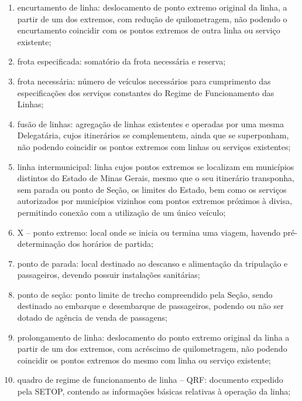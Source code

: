 \begin{enumerate}[resume,label=Art. \arabic*]
\begin{enumerate}[label=\roman*.]
\item encurtamento de linha: deslocamento de ponto extremo original da linha, a partir de um dos extremos, com redução de quilometragem, não podendo o encurtamento coincidir com os pontos extremos de outra linha ou serviço existente;

\item frota especificada: somatório da frota necessária e reserva;

\item frota necessária: número de veículos necessários para cumprimento das especificações dos serviços constantes do Regime de Funcionamento das Linhas;

\item fusão de linhas: agregação de linhas existentes e operadas por uma mesma Delegatária, cujos itinerários se complementem, ainda que se superponham, não podendo coincidir os pontos extremos com linhas ou serviços existentes;

\item linha intermunicipal: linha cujos pontos extremos se localizam em municípios distintos do Estado de Minas Gerais, mesmo que o seu itinerário transponha, sem parada ou ponto de Seção, os limites do Estado, bem como os serviços autorizados por municípios vizinhos com pontos extremos próximos à divisa, permitindo conexão com a utilização de um único veículo;

\item X – ponto extremo: local onde se inicia ou termina uma viagem, havendo pré-determinação dos horários de partida;

\item ponto de parada: local destinado ao descanso e alimentação da tripulação e passageiros, devendo possuir instalações sanitárias;

\item ponto de seção: ponto limite de trecho compreendido pela Seção, sendo destinado ao embarque e desembarque de passageiros, podendo ou não ser dotado de agência de venda de passagens;

\item prolongamento de linha: deslocamento do ponto extremo original da linha a partir de um dos extremos, com acréscimo de quilometragem, não podendo coincidir os pontos extremos do mesmo com linha ou serviço existente;

\item quadro de regime de funcionamento de linha – QRF: documento expedido pela SETOP, contendo as informações básicas relativas à operação da linha;


\end{enumerate}
\end{enumerate}
